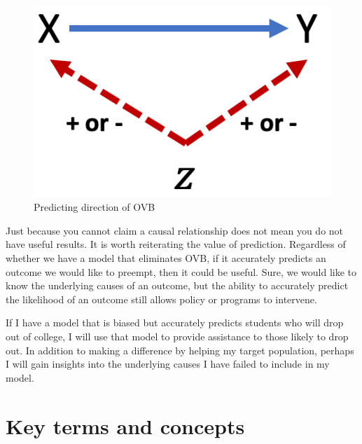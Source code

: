 \documentclass[
]{book}
\begin{document}
\begin{figure}

{\centering \includegraphics[width=\textwidth]{images/dag_ovbdirect} 

}

\caption{Predicting direction of OVB}\label{fig:dagovbdirect}
\end{figure}

Just because you cannot claim a causal relationship does not mean you do not have useful results. It is worth reiterating the value of prediction. Regardless of whether we have a model that eliminates OVB, if it accurately predicts an outcome we would like to preempt, then it could be useful. Sure, we would like to know the underlying causes of an outcome, but the ability to accurately predict the likelihood of an outcome still allows policy or programs to intervene.

If I have a model that is biased but accurately predicts students who will drop out of college, I will use that model to provide assistance to those likely to drop out. In addition to making a difference by helping my target population, perhaps I will gain insights into the underlying causes I have failed to include in my model.

\hypertarget{kt9}{%
\section{Key terms and concepts}\label{kt9}}
\end{document}
